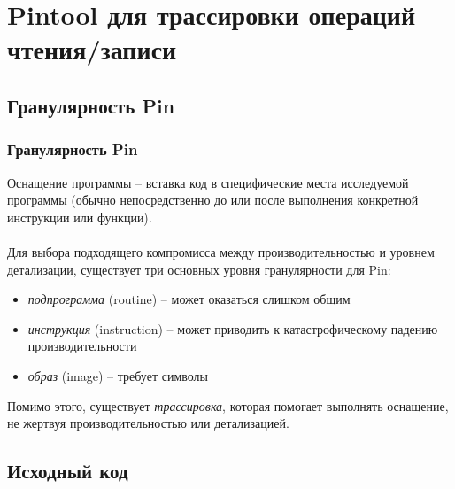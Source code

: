 \documentclass{beamer}
\begin{document}
\section{Pintool для трассировки операций чтения/записи}
\subsection{Гранулярность Pin}

\begin{frame}
\frametitle{Гранулярность Pin}
Оснащение программы -- вставка код в специфические места исследуемой программы (обычно непосредственно до или после выполнения конкретной инструкции или функции).\\~\\

Для выбора подходящего компромисса между производительностью и уровнем детализации, существует три основных уровня гранулярности для Pin:
\begin{itemize}
\item \textit{подпрограмма} (routine) -- может оказаться слишком общим
\item \textit{инструкция} (instruction) -- может приводить к катастрофическому падению производительности
\item \textit{образ} (image) -- требует символы
\end{itemize}

Помимо этого, существует \textit{трассировка}, которая помогает выполнять оснащение, не жертвуя производительностью или детализацией.
\end{frame}

\subsection{Исходный код}
\end{document}
